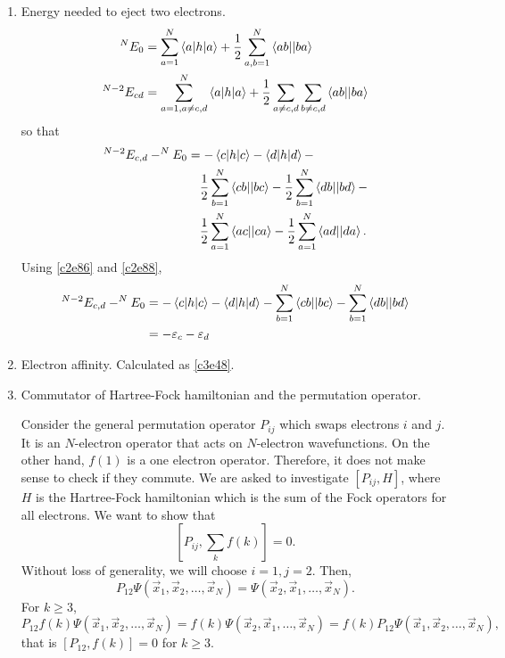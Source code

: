 \begin{enumerate}
\item\label{c3p5} Energy needed to eject two electrons.
\[
\begin{aligned}
^NE_0 &= \sum_{a=1}^N\braket{a|h|a} + \frac{1}{2}\sum_{a,b=1}^N\braket{ab||ba} \\
^{N-2}E_{cd} &= \sum_{a=1, a\ne c,d}^N\braket{a|h|a} +
\frac{1}{2}\sum_{a\ne c,d}\sum_{b \ne c,d}\braket{ab||ba}
\end{aligned}
\]
so that
\[
\begin{aligned}
^{N-2}E_{c,d} - ^NE_0 &= -\braket{c|h|c} - \braket{d|h|d} - \\
 &\quad \frac{1}{2}\sum_{b=1}^N\braket{cb||bc} - 
   \frac{1}{2}\sum_{b=1}^N\braket{db||bd} - \\
 &\quad \frac{1}{2}\sum_{a=1}^N\braket{ac||ca} - 
  \frac{1}{2}\sum_{a=1}^N\braket{ad||da}.
\end{aligned}
\]
Using \eqref{c2e86} and \eqref{c2e88},
\[
\begin{aligned}
^{N-2}E_{c,d} - ^NE_0 &= -\braket{c|h|c} - \braket{d|h|d} -
\sum_{b=1}^N\braket{cb||bc} - \sum_{b=1}^N\braket{db||bd} \\
 &= -\varepsilon_c - \varepsilon_d
\end{aligned}
\]

\item\label{c3p6} Electron affinity. Calculated as \eqref{c3e48}.

\item\label{c3p7} Commutator of Hartree-Fock hamiltonian and the permutation
operator.

Consider the general permutation operator $P_{ij}$ which swaps electrons $i$
and $j$. It is an $N$-electron operator that acts on $N$-electron
wavefunctions. On the other hand, $f(1)$ is a one electron operator. Therefore,
it does not make sense to check if they commute. We are asked to investigate
$[P_{ij}, H]$, where $H$ is the Hartree-Fock hamiltonian which is the sum of
the Fock operators for all electrons. We want to show that
\[
\left[P_{ij}, \sum_k f(k)\right] = 0.
\]
Without loss of generality, we will choose $i = 1, j = 2$. Then,
\[
P_{12}\Psi(\vec{x}_1, \vec{x}_2, \ldots, \vec{x}_N) = \Psi(\vec{x}_2,
\vec{x}_1, \ldots, \vec{x}_N).
\]
For $k \ge 3$,
\[
P_{12}f(k)\Psi(\vec{x}_1, \vec{x}_2, \ldots, \vec{x}_N) = f(k)\Psi(\vec{x}_2,
\vec{x}_1, \ldots, \vec{x}_N) = f(k)P_{12}\Psi(\vec{x}_1, \vec{x}_2, \ldots,
\vec{x}_N),
\]
that is $[P_{12}, f(k)] = 0$ for $k \ge 3$.


\end{enumerate}
